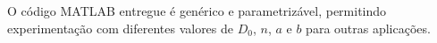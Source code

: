 \documentclass[12pt,a4paper,oneside,brazil,chapter=TITLE,section=TITLE]{abntex2}
\begin{document}
O c\'odigo MATLAB entregue \'e gen\'erico e parametriz\'avel, permitindo
experimenta\c{c}\~ao com diferentes valores de $D_0$, $n$, $a$ e $b$
para outras aplica\c{c}\~oes.

\postextual

\end{document}
